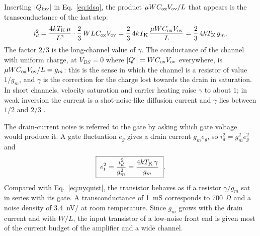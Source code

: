 \documentclass[11pt,a4paper]{article}
\begin{document}
%
Inserting $|Q_{\rm inv}|$ in Eq.~\eqref{eq:idsq}, the product
$\mu WC_{\rm ox}V_{\rm ov}/L$ that appears is the transconductance of
the last step:
%
\begin{equation}
 i_d^2=\frac{4kT_{\rm K}\,\mu}{L^2}\cdot\frac23\,WLC_{\rm ox}V_{\rm ov}
 =\frac23\,4kT_{\rm K}\,\frac{\mu WC_{\rm ox}V_{\rm ov}}{L}
 =\frac23\,4kT_{\rm K}\,g_m .
\label{eq:iddrain}
\end{equation}
%
The factor $2/3$ is the long-channel value of $\gamma$. The conductance of
the channel with uniform charge, at $V_{DS}=0$ where $|Q'|=WC_{\rm ox}V_{\rm ov}$
everywhere, is $\mu WC_{\rm ox}V_{\rm ov}/L=g_m$: this is the sense in which
the channel is a resistor of value $1/g_m$, and $\gamma$ is the correction for
the charge lost towards the drain in saturation. In short channels, velocity
saturation and carrier heating raise $\gamma$ to about $1$; in weak
inversion the current is a shot-noise-like diffusion current and
$\gamma$ lies between $1/2$ and $2/3$ \citep{vanderZiel1986,Tsividis2011}.

The drain-current noise is referred to the gate by asking which gate voltage
would produce it. A gate fluctuation $e_g$ gives a drain current $g_m e_g$,
so $i_d^2=g_m^2e_g^2$ and
%
\begin{equation}
 \boxed{\; e_t^2=\frac{i_d^2}{g_m^2}=\frac{4kT_{\rm K}\,\gamma}{g_m} \;}.
\label{eq:et}
\end{equation}
%
Compared with Eq.~\eqref{eq:nyquist}, the transistor behaves as if a
resistor $\gamma/g_m$ sat in series with its gate. A transconductance of
\SI{1}{mS} corresponds to \SI{700}{\ohm} and a noise density of
\SI{3.4}{nV/} at room temperature. Since $g_m$ grows with the drain
current and with $W/L$, the input transistor of a low-noise front end is
given most of the current budget of the amplifier and a wide channel.

\end{document}

